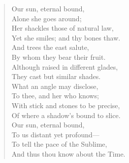 \begingroup
	\fontsize{10pt}{12pt}\selectfont
		\begin{quote}
			Our sun, eternal bound,\\
			Alone she goes around;\\
			Her shackles those of natural law,\\%
			Yet she smiles; and thy bones thaw.\\

			And trees the east salute,\\
			By whom they bear their fruit.\\
			Although raised in different glades,\\
			They cast but similar shades.\\

			What an angle may disclose,\\
			To thee, and her who knows;\\ %
			With stick and stones to be precise,\\
			Of where a shadow's bound to slice.\\

			Our sun, eternal bound,\\
			To us distant yet profound---\\
			To tell the pace of the Sublime,\\
			And thus thou know about the Time.\\
		\end{quote} 
\endgroup







